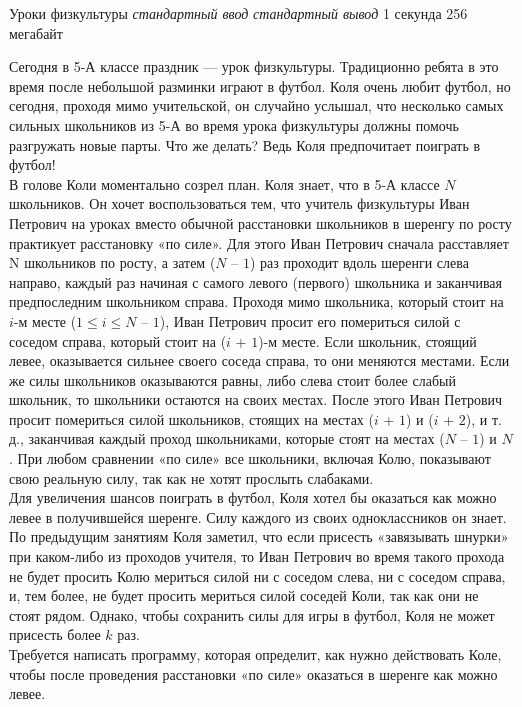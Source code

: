 \begin{problem}%
{Уроки физкультуры}%
{\textsl{стандартный ввод}}%
{\textsl{стандартный вывод}}%
{1 секунда}%
{256 мегабайт}{}

Сегодня в 5-А классе праздник — урок физкультуры. Традиционно ребята в это время после небольшой разминки играют в футбол. Коля очень любит футбол, но сегодня, проходя мимо учительской, он случайно услышал, что несколько самых сильных школьников из 5-А во время урока физкультуры должны помочь разгружать новые парты. Что же делать? Ведь Коля предпочитает поиграть в футбол!\\

В голове Коли моментально созрел план. Коля знает, что в 5-А классе $N$ школьников. Он хочет воспользоваться тем, что учитель физкультуры Иван Петрович на уроках вместо обычной расстановки школьников в шеренгу по росту практикует расстановку «по силе». Для этого Иван Петрович сначала расставляет N школьников по росту, а затем ($N$ – $1$) раз проходит вдоль шеренги слева направо, каждый раз начиная с самого левого (первого) школьника и заканчивая предпоследним школьником справа. Проходя мимо школьника, который стоит на $i$-м месте ($1 \le i \le N$ – $1$), Иван Петрович просит его помериться силой с соседом справа, который стоит на ($i$ + $1$)-м месте. Если школьник, стоящий левее, оказывается сильнее своего соседа справа, то они меняются местами. Если же силы школьников оказываются равны, либо слева стоит более слабый школьник, то школьники остаются на своих местах. После этого Иван Петрович просит помериться силой школьников, стоящих на местах ($i$ + $1$) и ($i$ + $2$), и т. д., заканчивая каждый проход школьниками, которые стоят на местах ($N$ – $1$) и $N$. При любом сравнении «по силе» все школьники, включая Колю, показывают свою реальную силу, так как не хотят прослыть слабаками.\\

Для увеличения шансов поиграть в футбол, Коля хотел бы оказаться как можно левее в получившейся шеренге. Силу каждого из своих одноклассников он знает. По предыдущим занятиям Коля заметил, что если присесть «завязывать шнурки» при каком-либо из проходов учителя, то Иван Петрович во время такого прохода не будет просить Колю мериться силой ни с соседом слева, ни с соседом справа, и, тем более, не будет просить мериться силой соседей Коли, так как они не стоят рядом. Однако, чтобы сохранить силы для игры в футбол, Коля не может присесть более $k$ раз.\\

Требуется написать программу, которая определит, как нужно действовать Коле, чтобы после проведения расстановки «по силе» оказаться в шеренге как можно левее.


\end{problem}
